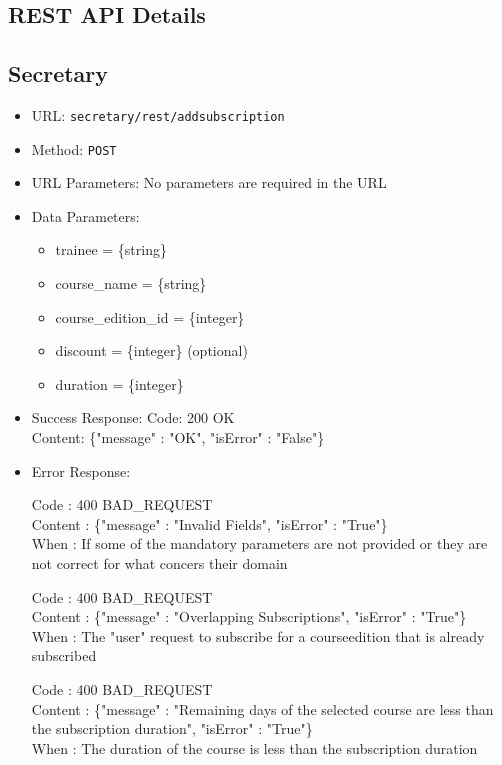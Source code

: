\subsection{REST API Details}

\subsection*{Secretary}

\begin{itemize}

    \item URL: \texttt{secretary/rest/addsubscription}
    \item Method: \texttt{POST}
    \item URL Parameters: No parameters are required in the URL
    \item Data Parameters: 
    \begin{itemize}
    	\item trainee = \{string\}
     	\item course\_name = \{string\}
     	\item course\_edition\_id = \{integer\}
     	\item discount = \{integer\} (optional)
     	\item duration = \{integer\}
    \end{itemize}
    \item Success Response:
    Code: 200 OK\\
    Content:  \{"message" : "OK", "isError" : "False"\}
    \item Error Response:
	
	Code : 400 BAD\_REQUEST\\
	Content : \{"message" : "Invalid Fields", "isError" : "True"\}\\
	When : If some of the mandatory parameters are not provided or they are not correct for what concers their domain
	
	Code : 400 BAD\_REQUEST\\
	Content : \{"message" : "Overlapping Subscriptions", "isError" : "True"\}\\
    When : The "user" request to subscribe for a courseedition that is already subscribed
    
    Code : 400 BAD\_REQUEST\\
    Content : \{"message" : "Remaining days of the selected course are less than the subscription duration", "isError" : "True"\}\\
    When : The duration of the course is less than the subscription duration
	

\end{itemize}
